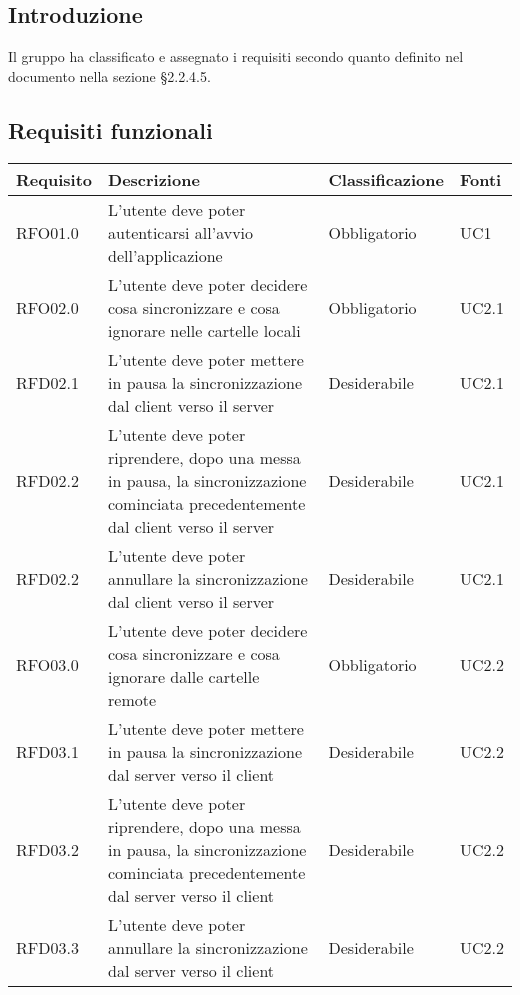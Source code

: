 \subsection{Introduzione}
Il gruppo \gruppo{} ha classificato e assegnato i requisiti secondo quanto definito nel documento \NdP{} \versNdP{} nella sezione \S{}2.2.4.5.

\subsection{Requisiti funzionali}
{
    \setlength{\freewidth}{\dimexpr\textwidth-8\tabcolsep}
    \renewcommand{\arraystretch}{1.5}
    \centering
    \setlength{\aboverulesep}{0pt}
    \setlength{\belowrulesep}{0pt}
    \begin{longtable}{C{.20\freewidth} C{.40\freewidth} C{.20\freewidth} C{.20\freewidth}}
        \toprule 
        \textbf{Requisito} & \textbf{Descrizione} & \textbf{Classificazione} & \textbf{Fonti} \\
        \toprule
        \endhead

        RFO01.0  & L'utente deve poter autenticarsi all'avvio dell'applicazione & Obbligatorio & UC1 \\

        RFO02.0  & L'utente deve poter decidere cosa sincronizzare e cosa ignorare nelle cartelle locali & Obbligatorio & UC2.1 \\
        RFD02.1  & L'utente deve poter mettere in pausa la sincronizzazione dal client verso il server & Desiderabile & UC2.1 \\
        RFD02.2  & L'utente deve poter riprendere, dopo una messa in pausa, la sincronizzazione cominciata precedentemente dal client verso il server & Desiderabile & UC2.1 \\
        RFD02.2  & L'utente deve poter annullare la sincronizzazione dal client verso il server & Desiderabile & UC2.1 \\

        RFO03.0  & L'utente deve poter decidere cosa sincronizzare e cosa ignorare dalle cartelle remote & Obbligatorio & UC2.2 \\
        RFD03.1  & L'utente deve poter mettere in pausa la sincronizzazione dal server verso il client & Desiderabile & UC2.2 \\
        RFD03.2  & L'utente deve poter riprendere, dopo una messa in pausa, la sincronizzazione cominciata precedentemente dal server verso il client & Desiderabile & UC2.2 \\
        RFD03.3  & L'utente deve poter annullare la sincronizzazione dal server verso il client & Desiderabile & UC2.2 \\


\end{longtable}}

